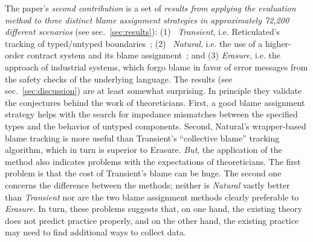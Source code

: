 The paper's {\it second contribution\/} is a set of {\em results from applying
the evaluation method to three distinct blame assignment strategies in
approximately 72,200 different scenarios\/} (see sec.~\ref{sec:results}): (1)~{\it
Transient\/}, i.e. Reticulated's tracking of typed/untyped boundaries~\cite{vss-popl-2017}; (2)~{\it
Natural\/}, i.e. the use of a higher-order contract system and its blame
assignment~\cite{ff-icfp-2002}; and (3) {\it Erasure\/}, i.e. the approach of
industrial systems, which forgo blame in favor of error messages from the safety
checks of the underlying language. The results (see
sec.~\ref{sec:discussion}) are at least somewhat surprising.  In principle
they validate the conjectures behind the work of theoreticians.  First, a good
blame assignment strategy helps with the search for impedance mismatches between
the specified types and the behavior of untyped components.  Second, Natural's
wrapper-based blame tracking is more useful than Transient's ``collective
blame'' tracking algorithm, which in turn is superior to Erasure. {\em But\/},
the application of the method also indicates problems with the expectations of
theoreticians. The first problem is that the cost of Transient's blame can be
huge. The second one concerns the difference between the methods; neither is
{\it Natural\/} vastly better than {\it Transient\/} nor are the two blame
assignment methods clearly preferable to {\it Erasure\/}.  In turn, these
problems suggests that, on one hand, the existing theory does not predict
practice properly, and on the other hand, the existing practice may need to find
additional ways to collect data.





